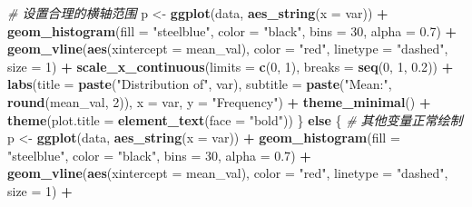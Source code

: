 \documentclass[
]{article}
\newenvironment{Shaded}{\begin{snugshade}}{\end{snugshade}}
\newcommand{\AttributeTok}[1]{\textcolor[rgb]{0.13,0.29,0.53}{#1}}
\newcommand{\CommentTok}[1]{\textcolor[rgb]{0.56,0.35,0.01}{\textit{#1}}}
\newcommand{\ControlFlowTok}[1]{\textcolor[rgb]{0.13,0.29,0.53}{\textbf{#1}}}
\newcommand{\DecValTok}[1]{\textcolor[rgb]{0.00,0.00,0.81}{#1}}
\newcommand{\FloatTok}[1]{\textcolor[rgb]{0.00,0.00,0.81}{#1}}
\newcommand{\FunctionTok}[1]{\textcolor[rgb]{0.13,0.29,0.53}{\textbf{#1}}}
\newcommand{\NormalTok}[1]{#1}
\newcommand{\OtherTok}[1]{\textcolor[rgb]{0.56,0.35,0.01}{#1}}
\newcommand{\SpecialCharTok}[1]{\textcolor[rgb]{0.81,0.36,0.00}{\textbf{#1}}}
\newcommand{\StringTok}[1]{\textcolor[rgb]{0.31,0.60,0.02}{#1}}
\begin{document}
\begin{Shaded}
\begin{Highlighting}[]
      \CommentTok{\# 设置合理的横轴范围}
\NormalTok{      p }\OtherTok{\textless{}{-}} \FunctionTok{ggplot}\NormalTok{(data, }\FunctionTok{aes\_string}\NormalTok{(}\AttributeTok{x =}\NormalTok{ var)) }\SpecialCharTok{+}
        \FunctionTok{geom\_histogram}\NormalTok{(}\AttributeTok{fill =} \StringTok{"steelblue"}\NormalTok{, }\AttributeTok{color =} \StringTok{"black"}\NormalTok{, }\AttributeTok{bins =} \DecValTok{30}\NormalTok{, }\AttributeTok{alpha =} \FloatTok{0.7}\NormalTok{) }\SpecialCharTok{+}
        \FunctionTok{geom\_vline}\NormalTok{(}\FunctionTok{aes}\NormalTok{(}\AttributeTok{xintercept =}\NormalTok{ mean\_val), }
                   \AttributeTok{color =} \StringTok{"red"}\NormalTok{, }\AttributeTok{linetype =} \StringTok{"dashed"}\NormalTok{, }\AttributeTok{size =} \DecValTok{1}\NormalTok{) }\SpecialCharTok{+}
        \FunctionTok{scale\_x\_continuous}\NormalTok{(}\AttributeTok{limits =} \FunctionTok{c}\NormalTok{(}\DecValTok{0}\NormalTok{, }\DecValTok{1}\NormalTok{), }\AttributeTok{breaks =} \FunctionTok{seq}\NormalTok{(}\DecValTok{0}\NormalTok{, }\DecValTok{1}\NormalTok{, }\FloatTok{0.2}\NormalTok{)) }\SpecialCharTok{+}
        \FunctionTok{labs}\NormalTok{(}\AttributeTok{title =} \FunctionTok{paste}\NormalTok{(}\StringTok{"Distribution of"}\NormalTok{, var),}
             \AttributeTok{subtitle =} \FunctionTok{paste}\NormalTok{(}\StringTok{"Mean:"}\NormalTok{, }\FunctionTok{round}\NormalTok{(mean\_val, }\DecValTok{2}\NormalTok{)),}
             \AttributeTok{x =}\NormalTok{ var, }\AttributeTok{y =} \StringTok{"Frequency"}\NormalTok{) }\SpecialCharTok{+}
        \FunctionTok{theme\_minimal}\NormalTok{() }\SpecialCharTok{+}
        \FunctionTok{theme}\NormalTok{(}\AttributeTok{plot.title =} \FunctionTok{element\_text}\NormalTok{(}\AttributeTok{face =} \StringTok{"bold"}\NormalTok{))}
\NormalTok{    \} }\ControlFlowTok{else}\NormalTok{ \{}
      \CommentTok{\# 其他变量正常绘制}
\NormalTok{      p }\OtherTok{\textless{}{-}} \FunctionTok{ggplot}\NormalTok{(data, }\FunctionTok{aes\_string}\NormalTok{(}\AttributeTok{x =}\NormalTok{ var)) }\SpecialCharTok{+}
        \FunctionTok{geom\_histogram}\NormalTok{(}\AttributeTok{fill =} \StringTok{"steelblue"}\NormalTok{, }\AttributeTok{color =} \StringTok{"black"}\NormalTok{, }\AttributeTok{bins =} \DecValTok{30}\NormalTok{, }\AttributeTok{alpha =} \FloatTok{0.7}\NormalTok{) }\SpecialCharTok{+}
        \FunctionTok{geom\_vline}\NormalTok{(}\FunctionTok{aes}\NormalTok{(}\AttributeTok{xintercept =}\NormalTok{ mean\_val), }
                   \AttributeTok{color =} \StringTok{"red"}\NormalTok{, }\AttributeTok{linetype =} \StringTok{"dashed"}\NormalTok{, }\AttributeTok{size =} \DecValTok{1}\NormalTok{) }\SpecialCharTok{+}

\end{Highlighting}
\end{Shaded}
\end{document}
